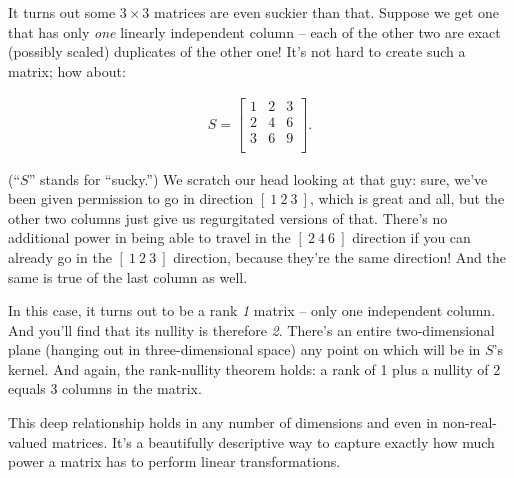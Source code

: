It turns out some $3\times 3$ matrices are even suckier than that. Suppose we
get one that has only \textit{one} linearly independent column -- each of the
other two are exact (possibly scaled) duplicates of the other one! It's not
hard to create such a matrix; how about:

\vspace{-.15in}
\begin{align*}
S =
\begin{bmatrix}
1 & 2 & 3 \\
2 & 4 & 6 \\
3 & 6 & 9 \\
\end{bmatrix}.
\end{align*}
\vspace{-.15in}


(``$S$'' stands for ``sucky.'') We scratch our head looking at that guy: sure,
we've been given permission to go in direction $[\ 1\ 2\ 3\ ]$, which is great
and all, but the other two columns just give us regurgitated versions of that.
There's no additional power in being able to travel in the $[\ 2\ 4\ 6\ ]$
direction if you can already go in the $[\ 1\ 2\ 3\ ]$ direction, because
they're the same direction! And the same is true of the last column as well.

In this case, it turns out to be a rank \textit{1} matrix -- only one
independent column. And you'll find that its nullity is therefore \textit{2}.
There's an entire two-dimensional plane (hanging out in three-dimensional space)
any point on which will be in $S$'s kernel. And again, the rank-nullity theorem
holds: a rank of 1 plus a nullity of 2 equals 3 columns in the matrix.

This deep relationship holds in any number of dimensions and even in
non-real-valued matrices. It's a beautifully descriptive way to capture exactly
how much power a matrix has to perform linear transformations.
